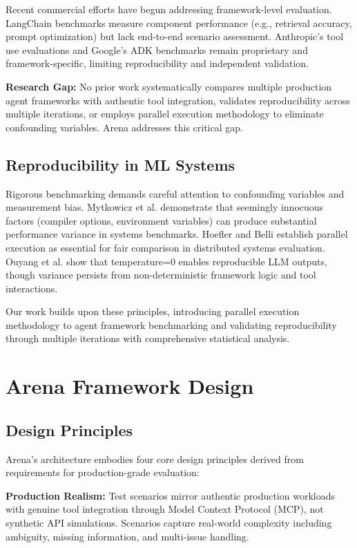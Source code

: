 \documentclass[sigconf,nonacm]{acmart}
\begin{document}
Recent commercial efforts have begun addressing framework-level evaluation. LangChain benchmarks \cite{langchain2023} measure component performance (e.g., retrieval accuracy, prompt optimization) but lack end-to-end scenario assessment. Anthropic's tool use evaluations and Google's ADK benchmarks remain proprietary and framework-specific, limiting reproducibility and independent validation.

\textbf{Research Gap:} No prior work systematically compares multiple production agent frameworks with authentic tool integration, validates reproducibility across multiple iterations, or employs parallel execution methodology to eliminate confounding variables. Arena addresses this critical gap.

\subsection{Reproducibility in ML Systems}

Rigorous benchmarking demands careful attention to confounding variables and measurement bias. Mytkowicz et al. \cite{mytkowicz2009producing} demonstrate that seemingly innocuous factors (compiler options, environment variables) can produce substantial performance variance in systems benchmarks. Hoefler and Belli \cite{hoefler2015scientific} establish parallel execution as essential for fair comparison in distributed systems evaluation. Ouyang et al. \cite{ouyang2023llm} show that temperature=0 enables reproducible LLM outputs, though variance persists from non-deterministic framework logic and tool interactions.

Our work builds upon these principles, introducing parallel execution methodology to agent framework benchmarking and validating reproducibility through multiple iterations with comprehensive statistical analysis.

\section{Arena Framework Design}

\subsection{Design Principles}

Arena's architecture embodies four core design principles derived from requirements for production-grade evaluation:

\textbf{Production Realism:} Test scenarios mirror authentic production workloads with genuine tool integration through Model Context Protocol (MCP), not synthetic API simulations. Scenarios capture real-world complexity including ambiguity, missing information, and multi-issue handling.
\end{document}
